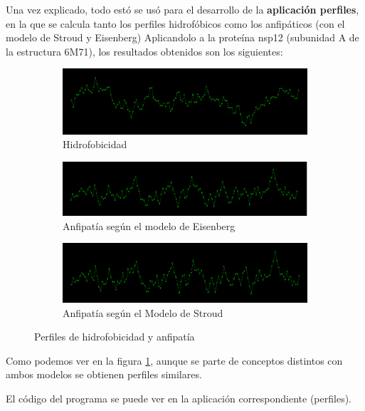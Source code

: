 \documentclass[a4paper,11pt]{report}
\begin{document}
  Una vez explicado, todo estó se usó para el desarrollo de la \textbf{aplicación perfiles}, en la que se calcula tanto los perfiles hidrofóbicos como los anfipáticos (con el modelo de Stroud y Eisenberg) Aplicandolo a la proteína nsp12 (subunidad A de la estructura 6M71), los resultados obtenidos son los siguientes:
  \begin{figure}[h!]
 	\centering
 	\begin{subfigure}{\textwidth}
 		\includegraphics[width=\linewidth]{Figuras/Figura24}
 		\caption{Hidrofobicidad}
 	\end{subfigure}  
  
 	\begin{subfigure}{\textwidth}
 		\includegraphics[width=\linewidth]{Figuras/Figura25}
 		\caption{Anfipatía según el modelo de Eisenberg}
 	\end{subfigure}
 
 	\begin{subfigure}{\textwidth}
 		\includegraphics[width=\linewidth]{Figuras/Figura26}
 		\caption{Anfipatía según el Modelo de Stroud}
 	\end{subfigure}
 \caption{Perfiles de hidrofobicidad y anfipatía}
 \label{fig: hidrof}	
 \end{figure}

Como podemos ver en la figura \ref{fig: hidrof}, aunque se parte de conceptos distintos con ambos modelos se obtienen perfiles similares.

El código del programa se puede ver en la aplicación correspondiente (perfiles).
 

 
\end{document}
